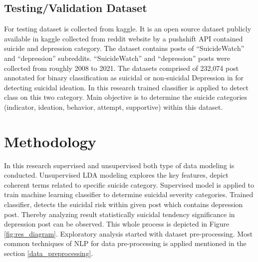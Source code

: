 \documentclass[sn-mathphys,Numbered]{sn-jnl}%
\theoremstyle{thmstyleone}%
\theoremstyle{thmstyletwo}%
\theoremstyle{thmstylethree}%
\begin{document}
\subsection{Testing/Validation Dataset} 
For testing dataset is collected from kaggle. It is an open source dataset publicly available in kaggle collected from reddit website by a pushshift API contained suicide and depression category. The dataset contains posts of \enquote{SuicideWatch} and \enquote{depression} subreddits. \enquote{SuicideWatch} and \enquote{depression} posts were collected from roughly 2008 to 2021. The datasets comprised of 232,074 post annotated for binary classification as suicidal or non-suicidal Depression in \cite{aldhyani2022detecting} for detecting suicidal ideation. In this research trained classifier is applied to detect class on this two category. Main objective is to determine the suicide categories (indicator, ideation, behavior, attempt, supportive) within this dataset. 


\section{Methodology}\label{methodolo}
In this research supervised and unsupervised both type of data modeling is conducted. Unsupervised LDA modeling explores the key features, depict coherent terms related to specific suicide category. Supervised model is applied to train machine learning classifier to determine suicidal severity categories. Trained classifier, detects the suicidal risk within given post which contains depression post. Thereby analyzing result statistically suicidal tendency significance in depression post can be observed. This whole process is depicted in Figure \ref{fig:res_diagram}. Exploratory analysis started with dataset pre-processing. Most common techniques of NLP for data pre-processing is applied mentioned in the section \ref{data_preprocessing}. 
\end{document}
